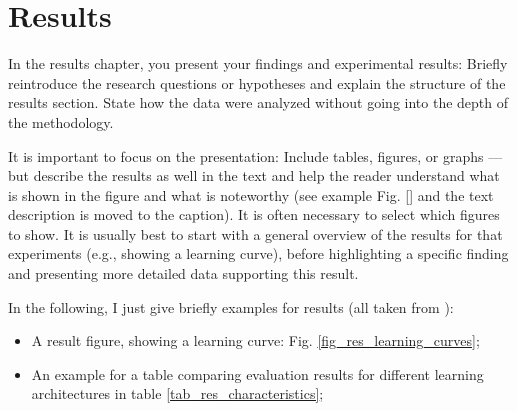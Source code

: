 \chapter{Results}
\label{ch:results}

In the results chapter, you present your findings and experimental results: Briefly reintroduce the research questions or hypotheses and explain the structure of the results section. State how the data were analyzed without going into the depth of the methodology.

It is important to focus on the presentation: Include tables, figures, or graphs --- but describe the results as well in the text and help the reader understand what is shown in the figure and what is noteworthy (see example Fig. \ref{} and the text description is moved to the caption). It is often necessary to select which figures to show. It is usually best to start with a general overview of the results for that experiments (e.g., showing a learning curve), before highlighting a specific finding and presenting more detailed data supporting this result. 

In the following, I just give briefly examples for results (all taken from ):
\begin{itemize}
\item A result figure, showing a learning curve: Fig. \ref{fig_res_learning_curves};
\item An example for a table comparing evaluation results for different learning architectures in table \ref{tab_res_characteristics};
\end{itemize}



